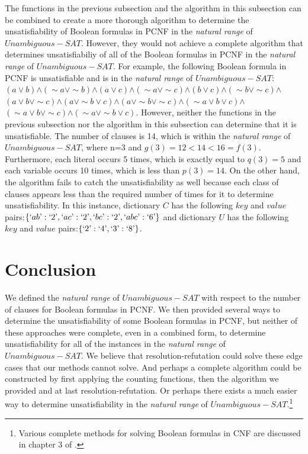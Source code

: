 \documentclass[runningheads,a4paper]{llncs}
\let\oldsim\sim
\renewcommand{\sim}{{\oldsim}}
\begin{document}
The functions in the previous subsection and the algorithm in this subsection can be combined to create a more thorough algorithm to determine the unsatisfiability of Boolean formulas in PCNF in the \emph{natural range} of ${Unambiguous-SAT}$. However, they would not achieve a complete algorithm that determines unsatisfiabiliy of all of the Boolean formulas in PCNF in the \emph{natural range} of ${Unambiguous-SAT}$. For example, the following Boolean formula in PCNF is unsatisfiable and is in the \emph{natural range} of ${Unambiguous-SAT}$: $({a}\vee {b})$$\wedge$$(\sim {a}\vee \sim {b})$$\wedge$$({a}\vee {c})$$\wedge$$(\sim {a}\vee \sim {c})$$\wedge$$({b}\vee {c})$$\wedge$$(\sim {b}\vee \sim {c})$$\wedge$$({a}\vee {b} \vee \sim {c})$$\wedge$$({a}\vee \sim {b} \vee {c})$$\wedge$$({a}\vee \sim {b} \vee \sim {c})$$\wedge$$(\sim {a}\vee {b} \vee {c})$$\wedge$$(\sim {a}\vee {b} \vee \sim {c})$$\wedge$$( \sim {a}\vee \sim {b} \vee {c})$. However, neither the functions in the previous subsection nor the algorithm in this subsection can determine that it is unsatisfiable. The number of clauses is 14, which is within the \emph{natural range} of ${Unambiguous-SAT}$, where n=3 and $g(3)=12<14<16=f(3)$. Furthermore, each literal occurs 5 times, which is exactly equal to $q(3)=5$ and each variable occurs 10 times, which is less than $p(3)=14$. On the other hand, the algorithm fails to catch the unsatisfiability as well because each class of clauses appears less than the required number of times for it to determine unsatisfiability. In this instance, dictionary $C$ has the following $key$ and $value$ pairs:$ \{`ab\textrm':`2\textrm', `ac\textrm':`2\textrm', `bc\textrm':`2\textrm', `abc\textrm':`6\textrm'\}$ and dictionary $U$ has the following $key$ and $value$ pairs:$\{`2\textrm':`4\textrm',`3\textrm':`8\textrm'\}$.


\section{Conclusion}

We defined the \emph{natural range} of ${Unambiguous-SAT}$ with respect to the number of clauses for Boolean formulas in PCNF. We then provided several ways to determine the unsatisfiability of some Boolean formulas in PCNF, but neither of these approaches were complete, even in a combined form, to determine unsatisfiability for all of the instances in the \emph{natural range} of ${Unambiguous-SAT}$. We believe that resolution-refutation could solve these edge cases that our methods cannot solve. And perhaps a complete algorithm could be constructed by first applying the counting functions, then the algorithm we provided and at last resolution-refutation. Or perhaps there exists a much easier way to determine unsatisfiability in the \emph{natural range} of ${Unambiguous-SAT}$.\footnote{Various complete methods for solving Boolean formulas in CNF are discussed in chapter 3 of  \cite{AMH09}.}
\end{document}
